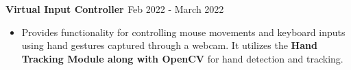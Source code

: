 \textbf{{Virtual Input Controller \href{https://github.com/priyansh17/virtual-input-controller} {\faExternalLinkSquare}}} \hfill {\faCalendar} Feb 2022 - March 2022 \par
\begin{itemize}
	\item Provides functionality for controlling mouse movements and keyboard inputs using hand gestures captured through a webcam. It utilizes the \textbf{Hand Tracking Module along with OpenCV} for hand detection and tracking.
\end{itemize}\vspace{0.1cm} \par